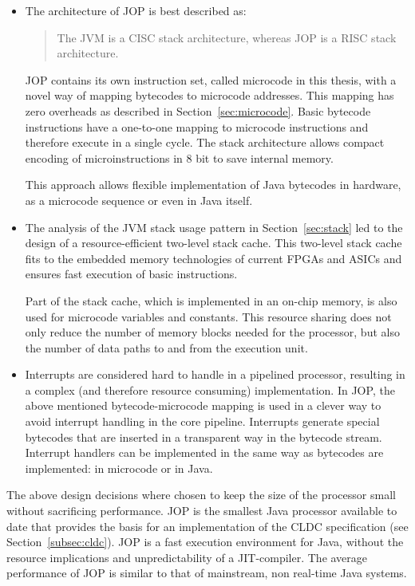 \begin{itemize}

    \item
The architecture of JOP is best described as:
\begin{quote}
    The JVM is a CISC stack architecture, whereas JOP is a RISC stack
    architecture.
\end{quote}
JOP contains its own instruction set, called microcode in this
thesis, with a novel way of mapping bytecodes to microcode
addresses. This mapping has zero overheads as described in
Section~\ref{sec:microcode}. Basic bytecode instructions have a
one-to-one mapping to microcode instructions and therefore execute
in a single cycle. The stack architecture allows compact encoding of
microinstructions in 8 bit to save internal memory.

This approach allows flexible implementation of Java bytecodes in
hardware, as a microcode sequence or even in Java itself.

    \item
The analysis of the JVM stack usage pattern in
Section~\ref{sec:stack} led to the design of a resource-efficient
two-level stack cache. This two-level stack cache fits to the
embedded memory technologies of current FPGAs and ASICs and ensures
fast execution of basic instructions.

Part of the stack cache, which is implemented in an on-chip memory,
is also used for microcode variables and constants. This resource
sharing does not only reduce the number of memory blocks needed for
the processor, but also the number of data paths to and from the
execution unit.

    \item
Interrupts are considered hard to handle in a pipelined processor,
resulting in a complex (and therefore resource consuming)
implementation. In JOP, the above mentioned bytecode-microcode
mapping is used in a clever way to avoid interrupt handling in the
core pipeline.
%
%
Interrupts generate special bytecodes that are inserted in a
transparent way in the bytecode stream. Interrupt handlers can be
implemented in the same way as bytecodes are implemented: in
microcode or in Java.


\end{itemize}

The above design decisions where chosen to keep the size of the
processor small without sacrificing performance. JOP is the smallest
Java processor available to date that provides the basis for an
implementation of the CLDC specification (see
Section~\ref{subsec:cldc}). JOP is a fast execution environment for
Java, without the resource implications and unpredictability of a
JIT-compiler. The average performance of JOP is similar to that of
mainstream, non real-time Java systems.

